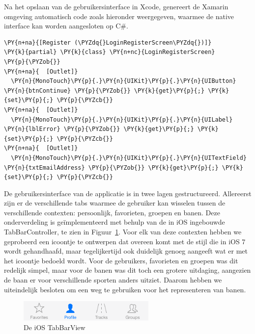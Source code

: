 Na het opslaan van de gebruikersinterface in Xcode, genereert de Xamarin omgeving automatisch code zoals hieronder weergegeven, waarmee de native interface kan worden aangesloten op C\#.



\begin{Verbatim}[commandchars=\\\{\}]
\PY{n+na}{[Register (\PYZdq{}LoginRegisterScreen\PYZdq{})]}
\PY{k}{partial} \PY{k}{class} \PY{n+nc}{LoginRegisterScreen}
\PY{p}{\PYZob{}}
\PY{n+na}{  [Outlet]}
  \PY{n}{MonoTouch}\PY{p}{.}\PY{n}{UIKit}\PY{p}{.}\PY{n}{UIButton} \PY{n}{btnContinue} \PY{p}{\PYZob{}} \PY{k}{get}\PY{p}{;} \PY{k}{set}\PY{p}{;} \PY{p}{\PYZcb{}}
\PY{n+na}{  [Outlet]}
  \PY{n}{MonoTouch}\PY{p}{.}\PY{n}{UIKit}\PY{p}{.}\PY{n}{UILabel} \PY{n}{lblError} \PY{p}{\PYZob{}} \PY{k}{get}\PY{p}{;} \PY{k}{set}\PY{p}{;} \PY{p}{\PYZcb{}}
\PY{n+na}{  [Outlet]}
  \PY{n}{MonoTouch}\PY{p}{.}\PY{n}{UIKit}\PY{p}{.}\PY{n}{UITextField} \PY{n}{txtEmailAddress} \PY{p}{\PYZob{}} \PY{k}{get}\PY{p}{;} \PY{k}{set}\PY{p}{;} \PY{p}{\PYZcb{}}
\end{Verbatim}

De gebruikersinterface van de applicatie is in twee lagen gestructureerd. Allereerst zijn er de verschillende tabs waarmee de gebruiker kan wisselen tussen de verschillende contexten: persoonlijk, favorieten, groepen en banen. Deze onderverdeling is geïmplementeerd met behulp van de in iOS ingebouwde TabBarController, te zien in Figuur~\ref{fig:tab-view}. Voor elk van deze contexten hebben we geprobeerd een icoontje te ontwerpen dat overeen komt met de stijl die in iOS 7 wordt gehandhaafd, maar tegelijkertijd ook duidelijk genoeg aangeeft wat er met het icoontje bedoeld wordt. Voor de gebruikers, favorieten en groepen was dit redelijk simpel, maar voor de banen was dit toch een grotere uitdaging, aangezien de baan er voor verschillende sporten anders uitziet. Daarom hebben we uiteindelijk besloten om een weg te gebruiken voor het representeren van banen.

\begin{figure}[h!]
\centering
\includegraphics[width=0.6\textwidth]{style/images/TabView}
\caption{De iOS TabBarView}
\label{fig:tab-view}
\end{figure}

